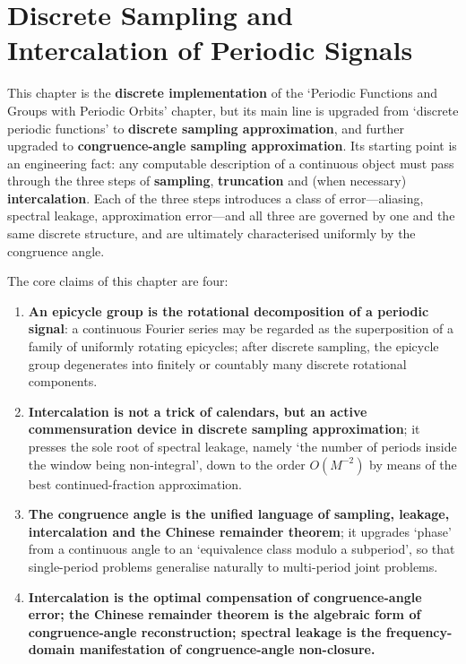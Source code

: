 \chapter{Discrete Sampling and Intercalation of Periodic Signals}
\label{chap:sampling}

\begin{remark}\label{rem:discrete_periodic_chapter_positioning}
This chapter is the \textbf{discrete implementation} of the `Periodic Functions and Groups with Periodic Orbits' chapter, but its main line is upgraded from `discrete periodic functions' to \textbf{discrete sampling approximation}, and further upgraded to \textbf{congruence-angle sampling approximation}. Its starting point is an engineering fact: any computable description of a continuous object must pass through the three steps of \textbf{sampling}, \textbf{truncation} and (when necessary) \textbf{intercalation}. Each of the three steps introduces a class of error---aliasing, spectral leakage, approximation error---and all three are governed by one and the same discrete structure, and are ultimately characterised uniformly by the congruence angle.

The core claims of this chapter are four:
\begin{enumerate}[label=(\roman*)]
    \item \textbf{An epicycle group is the rotational decomposition of a periodic signal}: a continuous Fourier series may be regarded as the superposition of a family of uniformly rotating epicycles; after discrete sampling, the epicycle group degenerates into finitely or countably many discrete rotational components.
    \item \textbf{Intercalation is not a trick of calendars, but an active commensuration device in discrete sampling approximation}; it presses the sole root of spectral leakage, namely `the number of periods inside the window being non-integral', down to the order $O(M^{-2})$ by means of the best continued-fraction approximation.
    \item \textbf{The congruence angle is the unified language of sampling, leakage, intercalation and the Chinese remainder theorem}; it upgrades `phase' from a continuous angle to an `equivalence class modulo a subperiod', so that single-period problems generalise naturally to multi-period joint problems.
    \item \textbf{Intercalation is the optimal compensation of congruence-angle error; the Chinese remainder theorem is the algebraic form of congruence-angle reconstruction; spectral leakage is the frequency-domain manifestation of congruence-angle non-closure.}
\end{enumerate}


\end{remark}
